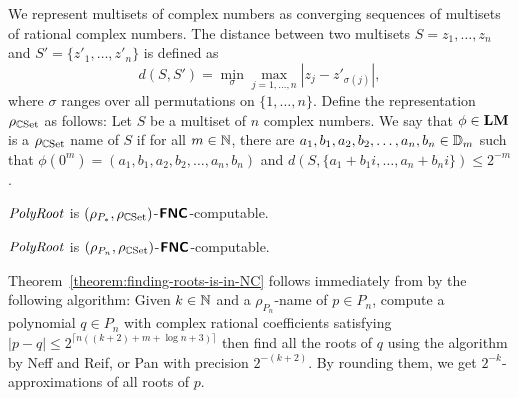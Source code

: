 \documentclass[envcountsame,orivec,oribibl]{llncs}
\begin{document}
We represent multisets of complex numbers as converging sequences of 
multisets of rational complex numbers.
The distance between two multisets $S = {z_1, \dots, z_n}$
and $S' = \{z'_1, \dots, z'_n\}$ is defined as
\begin{equation}
d(S, S') = \min_{\sigma} \max_{j = 1, \ldots, n}|z_j - z'_{\sigma(j)}|,
\end{equation}
where $\sigma$ ranges over all permutations on $\{1, \ldots, n\}$. 
Define the representation $\rho_{\mathbb C\mathrm{Set}}$ as follows:
Let $S$ be a multiset of $n$ complex numbers. 
We say that $\phi \in \mathbf{LM}$ is a $\rho_{\mathbb C\mathrm{Set}}$ name of $S$ if
for all $m \in \mathbb N$, there are $a_1, b_1, a_2, b_2, \dots, a_n, b_n \in \mathbb D_m$
such that $\phi(0^m) = ( a_1, b_1, a_2, b_2, \dots, a_n, b_n )$
and $d(S, \{a_1 + b_1 i, \dots, a_n + b_n i\}) \le 2^{-m}$.


\begin{theorem}
 \label{theorem:finding-roots-is-in-NC}
 $\mathit{PolyRoot}$ is $(\rho_{P_*}, \rho_{\mathbb C\mathrm{Set}})$-$\text{\bfseries \sffamily \upshape FNC}$-computable.
\end{theorem}

\begin{corollary}
 $\mathit{PolyRoot}$ is $(\rho_{P_n}, \rho_{\mathbb C\mathrm{Set}})$-$\text{\bfseries \sffamily \upshape FNC}$-computable.
\end{corollary}


Theorem~\ref{theorem:finding-roots-is-in-NC} follows immediately from
by the following algorithm:
Given $k \in \mathbb N$ and a $\rho_{P_n}$-name of $p \in P_n$, 
compute a polynomial $q \in {P_n}$ with complex rational coefficients
satisfying $|p - q| \le 2^{\lceil n((k+2) + m + \log n + 3)\rceil}$
then find all the roots of $q$ using the algorithm by Neff and Reif, or Pan
with precision $2^{-(k+2)}$.
By rounding them, we get $2^{-k}$-approximations of all roots of $p$.
\end{document}
